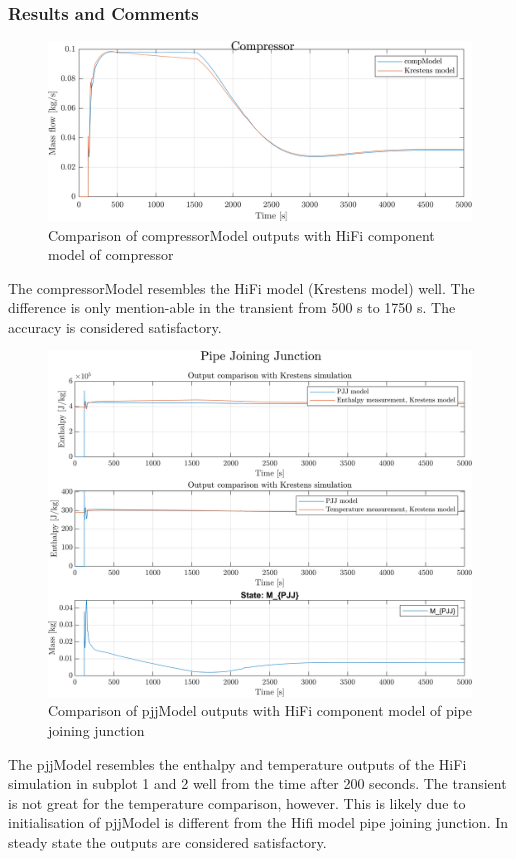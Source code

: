 \clearpage
\subsubsection*{Results and Comments}

\begin{figure}[h]
	\centering
	\includegraphics[width=1\textwidth]{Graphics/comp_test_com.png}
	\caption{Comparison of compressorModel outputs with HiFi component model of compressor}
	\label{fig:component_test_com}
\end{figure}
The compressorModel resembles the HiFi model (Krestens model) well. The difference is only mention-able in the transient from 500 s to 1750 s. The accuracy is considered satisfactory.
\clearpage
\begin{figure}[h]
	\centering
	\includegraphics[width=1\textwidth]{Graphics/comp_test_pjj.png}
	\caption{Comparison of pjjModel outputs with HiFi component model of pipe joining junction}
	\label{fig:component_test_pjj}
\end{figure}
The pjjModel resembles the enthalpy and temperature outputs of the HiFi simulation in subplot 1 and 2 well from the time after 200 seconds. The transient is not great for the temperature comparison, however. This is likely due to initialisation of pjjModel is different from the Hifi model pipe joining junction.
In steady state the outputs are considered satisfactory.

